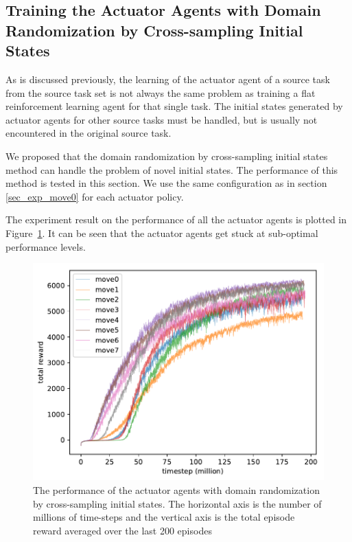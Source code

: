 \subsection{Training the Actuator Agents with Domain Randomization by Cross-sampling Initial States}
As is discussed previously, the learning of the actuator agent of a source task from the source task set is not always the same problem as training a flat reinforcement learning agent for that single task. The initial states generated by actuator agents for other source tasks must be handled, but is usually not encountered in the original source task.

We proposed that the domain randomization by cross-sampling initial states method can handle the problem of novel initial states. The performance of this method is tested in this section. We use the same configuration as in section \ref{sec_exp_move0} for each actuator policy.  

The experiment result on the performance of all the actuator agents is plotted in Figure~\ref{rec_8task_training}. It can be seen that the actuator agents get stuck at sub-optimal performance levels. 

\begin{figure}[!htbp]
	\includegraphics[width=\textwidth]{images/rec_180617_joint8.pdf}
	\centering
	\caption{The performance of the actuator agents with domain randomization by cross-sampling initial states. The horizontal axis is the number of millions of time-steps and the vertical axis is the total episode reward averaged over the last 200 episodes}\label{rec_8task_training}
\end{figure}

